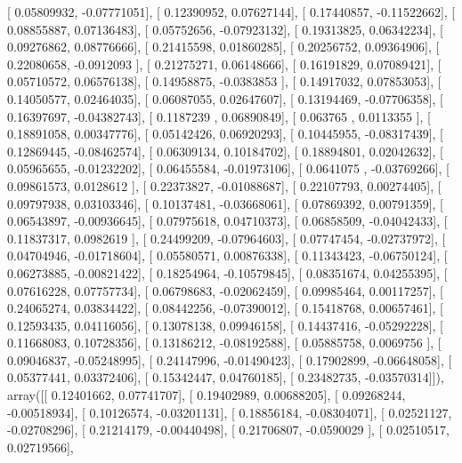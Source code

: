 \documentclass{article}
\begin{document}
       [ 0.05809932, -0.07771051],
       [ 0.12390952,  0.07627144],
       [ 0.17440857, -0.11522662],
       [ 0.08855887,  0.07136483],
       [ 0.05752656, -0.07923132],
       [ 0.19313825,  0.06342234],
       [ 0.09276862,  0.08776666],
       [ 0.21415598,  0.01860285],
       [ 0.20256752,  0.09364906],
       [ 0.22080658, -0.0912093 ],
       [ 0.21275271,  0.06148666],
       [ 0.16191829,  0.07089421],
       [ 0.05710572,  0.06576138],
       [ 0.14958875, -0.0383853 ],
       [ 0.14917032,  0.07853053],
       [ 0.14050577,  0.02464035],
       [ 0.06087055,  0.02647607],
       [ 0.13194469, -0.07706358],
       [ 0.16397697, -0.04382743],
       [ 0.1187239 ,  0.06890849],
       [ 0.063765  ,  0.0113355 ],
       [ 0.18891058,  0.00347776],
       [ 0.05142426,  0.06920293],
       [ 0.10445955, -0.08317439],
       [ 0.12869445, -0.08462574],
       [ 0.06309134,  0.10184702],
       [ 0.18894801,  0.02042632],
       [ 0.05965655, -0.01232202],
       [ 0.06455584, -0.01973106],
       [ 0.0641075 , -0.03769266],
       [ 0.09861573,  0.0128612 ],
       [ 0.22373827, -0.01088687],
       [ 0.22107793,  0.00274405],
       [ 0.09797938,  0.03103346],
       [ 0.10137481, -0.03668061],
       [ 0.07869392,  0.00791359],
       [ 0.06543897, -0.00936645],
       [ 0.07975618,  0.04710373],
       [ 0.06858509, -0.04042433],
       [ 0.11837317,  0.0982619 ],
       [ 0.24499209, -0.07964603],
       [ 0.07747454, -0.02737972],
       [ 0.04704946, -0.01718604],
       [ 0.05580571,  0.00876338],
       [ 0.11343423, -0.06750124],
       [ 0.06273885, -0.00821422],
       [ 0.18254964, -0.10579845],
       [ 0.08351674,  0.04255395],
       [ 0.07616228,  0.07757734],
       [ 0.06798683, -0.02062459],
       [ 0.09985464,  0.00117257],
       [ 0.24065274,  0.03834422],
       [ 0.08442256, -0.07390012],
       [ 0.15418768,  0.00657461],
       [ 0.12593435,  0.04116056],
       [ 0.13078138,  0.09946158],
       [ 0.14437416, -0.05292228],
       [ 0.11668083,  0.10728356],
       [ 0.13186212, -0.08192588],
       [ 0.05885758,  0.0069756 ],
       [ 0.09046837, -0.05248995],
       [ 0.24147996, -0.01490423],
       [ 0.17902899, -0.06648058],
       [ 0.05377441,  0.03372406],
       [ 0.15342447,  0.04760185],
       [ 0.23482735, -0.03570314]]), array([[ 0.12401662,  0.07741707],
       [ 0.19402989,  0.00688205],
       [ 0.09268244, -0.00518934],
       [ 0.10126574, -0.03201131],
       [ 0.18856184, -0.08304071],
       [ 0.02521127, -0.02708296],
       [ 0.21214179, -0.00440498],
       [ 0.21706807, -0.0590029 ],
       [ 0.02510517,  0.02719566],
\end{document}
